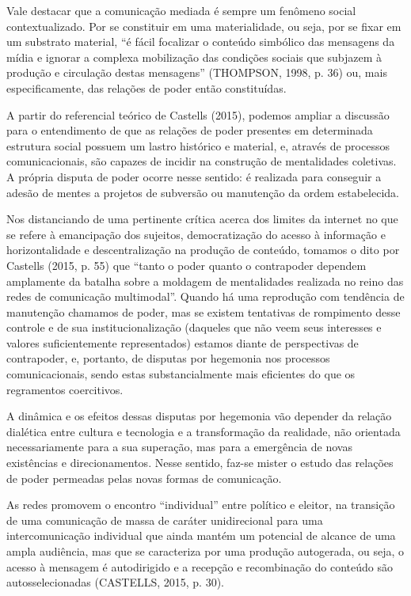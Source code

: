 Vale destacar que a comunicação mediada é sempre um fenômeno social
contextualizado. Por se constituir em uma materialidade, ou seja, por se
fixar em um substrato material, ``é fácil focalizar o conteúdo simbólico
das mensagens da mídia e ignorar a complexa mobilização das condições
sociais que subjazem à produção e circulação destas mensagens''
(THOMPSON, 1998, p. 36) ou, mais especificamente, das relações de poder
então constituídas.

A partir do referencial teórico de Castells (2015), podemos ampliar a
discussão para o entendimento de que as relações de poder presentes em
determinada estrutura social possuem um lastro histórico e material, e,
através de processos comunicacionais, são capazes de incidir na
construção de mentalidades coletivas. A própria disputa de poder ocorre
nesse sentido: é realizada para conseguir a adesão de mentes a projetos
de subversão ou manutenção da ordem estabelecida.

Nos distanciando de uma pertinente crítica acerca dos limites da
internet no que se refere à emancipação dos sujeitos, democratização do
acesso à informação e horizontalidade e descentralização na produção de
conteúdo, tomamos o dito por Castells (2015, p. 55) que ``tanto o poder
quanto o contrapoder dependem amplamente da batalha sobre a moldagem de
mentalidades realizada no reino das redes de comunicação multimodal''.
Quando há uma reprodução com tendência de manutenção chamamos de poder,
mas se existem tentativas de rompimento desse controle e de sua
institucionalização (daqueles que não veem seus interesses e valores
suficientemente representados) estamos diante de perspectivas de
contrapoder, e, portanto, de disputas por hegemonia nos processos
comunicacionais, sendo estas substancialmente mais eficientes do que os
regramentos coercitivos.

A dinâmica e os efeitos dessas disputas por hegemonia vão depender da
relação dialética entre cultura e tecnologia e a transformação da
realidade, não orientada necessariamente para a sua superação, mas para
a emergência de novas existências e direcionamentos. Nesse sentido,
faz-se mister o estudo das relações de poder permeadas pelas novas
formas de comunicação.

As redes promovem o encontro ``individual'' entre político e eleitor, na
transição de uma comunicação de massa de caráter unidirecional para uma
intercomunicação individual que ainda mantém um potencial de alcance de
uma ampla audiência, mas que se caracteriza por uma produção autogerada,
ou seja, o acesso à mensagem é autodirigido e a recepção e recombinação
do conteúdo são autosselecionadas (CASTELLS, 2015, p. 30).

